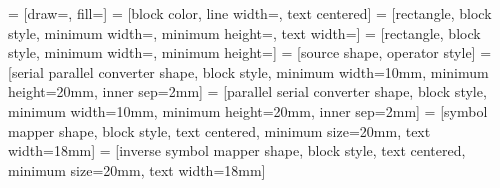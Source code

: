 %



%
%
%
   = [draw=\blockdrawcolor,
      fill=\blockfillcolor]
%
   = [block color,
      line width=\blocklinewidth,
      text centered]
%
   = [rectangle,
      block style,
      minimum width=\blockwidth,
      minimum height=\blockheight,
      text width=\blocktextwidth]
%
   = [rectangle,
      block style,
      minimum width=\filterwidth,
      minimum height=\filterheight]
%
   = [source shape,
      operator style]
%
   = [serial parallel converter shape,
      block style,
      minimum width=10mm,
      minimum height=20mm,
      inner sep=2mm]
%
   = [parallel serial converter shape,
      block style,
      minimum width=10mm,
      minimum height=20mm,
      inner sep=2mm]
%
   = [symbol mapper shape,
      block style,
      text centered,
      minimum size=20mm,
      text width=18mm]
%
   = [inverse symbol mapper shape,
      block style,
      text centered,
      minimum size=20mm,
      text width=18mm]



